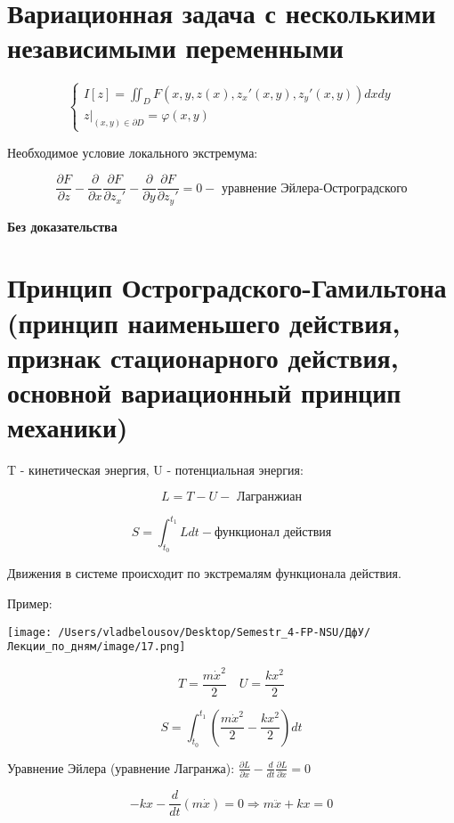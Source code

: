 \documentclass[12pt, a4paper]{report}
\begin{document}
\section{Вариационная задача с несколькими независимыми переменными}

\[ \begin{cases}
    I [ z] = \iint_{D } F (x, y , z(x ), z_x ' ( x,y), z_y ' ( x,y )) dx dy \\
    z  | _{(x,y ) \in  \partial D } = \varphi ( x,y)
\end{cases} \] 

Необходимое условие локального экстремума: 

\[ \frac{\partial  F }{ \partial z } - \frac{\partial  }{\partial  x } \frac{\partial  F }{ \partial z_x ' } - \frac{\partial  }{\partial  y } \frac{\partial  F }{ \partial z_y ' } = 0    - \text{ уравнение Эйлера-Остроградского}   \] 

\textbf{Без доказательства} 

\section{Принцип Остроградского-Гамильтона (принцип наименьшего действия, признак стационарного действия, основной вариационный принцип механики)}

T - кинетическая энергия, U - потенциальная энергия: 

\[ L = T - U - \text{ Лагранжиан}  \] 

\[ S = \int_{t_0 }^{t_1} L dt - \text{функционал действия}  \] 

Движения в системе происходит  по экстремалям функционала действия. 

Пример: 

\begin{center}
    \texttt{[image: /Users/vladbelousov/Desktop/Semestr\_4-FP-NSU/ДфУ/Лекции\_по\_дням/image/17.png]}
\end{center}

\[ T = \frac{m \dot{x } ^2 }{2} \quad  U = \frac{k x ^2 }{2}  \] 

\[ S = \int_{t_0 }^{t_1} \left( \frac{m \dot{x } ^2 }{2} -  \frac{k x ^2 }{2}\right)  dt \] 

Уравнение Эйлера (уравнение Лагранжа): \( \displaystyle  \frac{\partial L }{ \partial x  } - \frac{d}{dt} \frac{\partial L }{ \partial \dot{x}  } = 0  \) 

\[ - kx - \frac{d}{dt } ( m \dot{x } ) = 0  \Rightarrow m \ddot{x} + kx = 0  \] 
\end{document}
